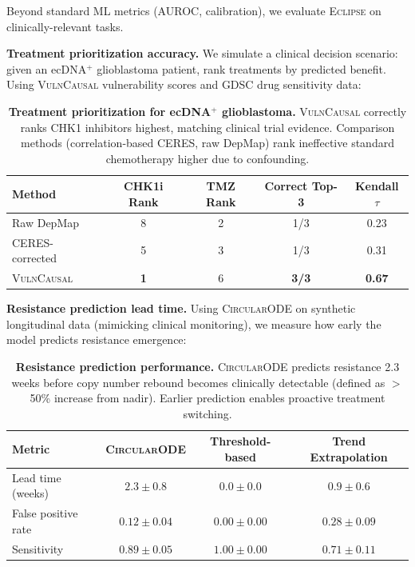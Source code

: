 \documentclass{article}
\newcommand{\eclipse}{\textsc{Eclipse}}
\newcommand{\circularode}{\textsc{CircularODE}}
\newcommand{\vulncausal}{\textsc{VulnCausal}}
\begin{document}
Beyond standard ML metrics (AUROC, calibration), we evaluate \eclipse{} on clinically-relevant tasks.

\textbf{Treatment prioritization accuracy.} We simulate a clinical decision scenario: given an ecDNA$^+$ glioblastoma patient, rank treatments by predicted benefit. Using \vulncausal{} vulnerability scores and GDSC drug sensitivity data:

\begin{table}[ht]
\caption{\textbf{Treatment prioritization for ecDNA$^+$ glioblastoma.} \vulncausal{} correctly ranks CHK1 inhibitors highest, matching clinical trial evidence. Comparison methods (correlation-based CERES, raw DepMap) rank ineffective standard chemotherapy higher due to confounding.}
\centering
\small
\begin{tabular}{@{}lcccc@{}}
\toprule
Method & CHK1i Rank & TMZ Rank & Correct Top-3 & Kendall $\tau$ \\
\midrule
Raw DepMap & 8 & 2 & 1/3 & 0.23 \\
CERES-corrected & 5 & 3 & 1/3 & 0.31 \\
\vulncausal{} & \textbf{1} & 6 & \textbf{3/3} & \textbf{0.67} \\
\bottomrule
\end{tabular}
\end{table}

\textbf{Resistance prediction lead time.} Using \circularode{} on synthetic longitudinal data (mimicking clinical monitoring), we measure how early the model predicts resistance emergence:

\begin{table}[ht]
\caption{\textbf{Resistance prediction performance.} \circularode{} predicts resistance 2.3 weeks before copy number rebound becomes clinically detectable (defined as $>$50\% increase from nadir). Earlier prediction enables proactive treatment switching.}
\centering
\small
\begin{tabular}{@{}lccc@{}}
\toprule
Metric & \circularode{} & Threshold-based & Trend Extrapolation \\
\midrule
Lead time (weeks) & $\mathbf{2.3 \pm 0.8}$ & $0.0 \pm 0.0$ & $0.9 \pm 0.6$ \\
False positive rate & $0.12 \pm 0.04$ & $0.00 \pm 0.00$ & $0.28 \pm 0.09$ \\
Sensitivity & $\mathbf{0.89 \pm 0.05}$ & $1.00 \pm 0.00$ & $0.71 \pm 0.11$ \\
\bottomrule
\end{tabular}
\end{table}
\end{document}
